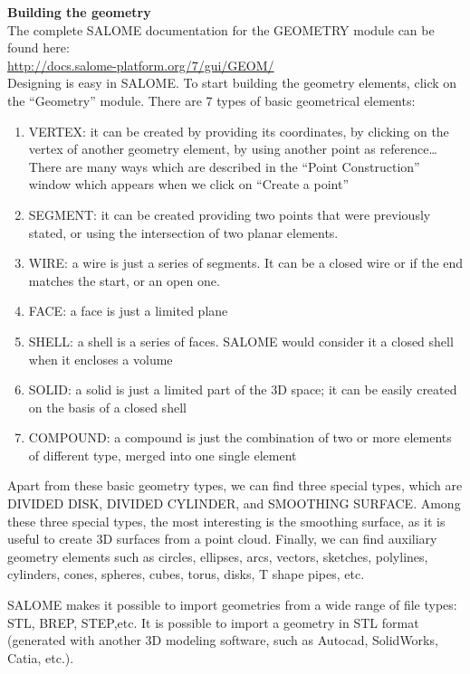 \documentclass[12pt]{memoir}
\begin{document}
\textbf{Building the geometry}\\

The complete SALOME documentation for the GEOMETRY module can be found here:\\
\url{http://docs.salome-platform.org/7/gui/GEOM/}\\

Designing is easy in SALOME. To start building the geometry 
elements, click on the “Geometry” module. 
There are 7 types of basic geometrical elements:
\begin{enumerate}
\item VERTEX: it can be created by providing its coordinates, 
by clicking on the vertex of another geometry element, 
by using another point as reference…There are many ways 
which are described in the “Point Construction” window 
which appears when we click on “Create a point”
\item SEGMENT: it can be created providing two points 
that were previously stated, or using the intersection of 
two planar elements. 
\item WIRE: a wire is just a series of segments. 
It can be a closed wire or if the end matches the start, 
or an open one.
\item FACE: a face is just a limited plane 
\item SHELL: a shell is a series of faces. 
SALOME would consider it a closed shell when it 
encloses a volume
\item SOLID: a solid is just a limited part of the 3D space; 
it can be easily created on the basis of a closed shell
\item COMPOUND: a compound is just the combination 
of two or more elements of different type, merged 
into one single element
\end{enumerate}
Apart from these basic geometry types, we can find 
three special types, which are 
DIVIDED DISK, DIVIDED CYLINDER, and SMOOTHING SURFACE. 
Among these three special types, the most interesting 
is the smoothing surface, as it is useful to create 
3D surfaces from a point cloud.
Finally, we can find auxiliary geometry elements such as 
circles, ellipses, arcs, vectors, sketches, polylines, cylinders, 
cones, spheres, cubes, torus, disks, T shape pipes, etc.

SALOME makes it possible to import geometries from 
a wide range of file types: STL, BREP, STEP,etc. 
It is possible to import a geometry in STL format 
(generated with another 3D modeling software, such 
as Autocad, SolidWorks, Catia, etc.). \\
\end{document}
